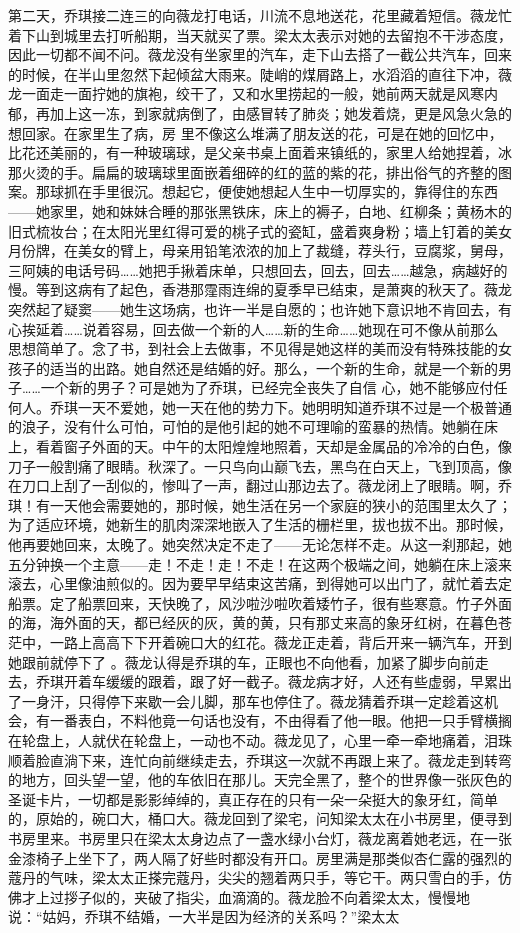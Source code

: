 \documentclass{article}
\begin{document}
第二天，乔琪接二连三的向薇龙打电话，川流不息地送花，花里藏着短信。薇龙忙着下山到城里去打听船期，当天就买了票。梁太太表示对她的去留抱不干涉态度，因此一切都不闻不问。薇龙没有坐家里的汽车，走下山去搭了一截公共汽车，回来的时候，在半山里忽然下起倾盆大雨来。陡峭的煤屑路上，水滔滔的直往下冲，薇龙一面走一面拧她的旗袍，绞干了，又和水里捞起的一般，她前两天就是风寒内郁，再加上这一冻，到家就病倒了，由感冒转了肺炎；她发着烧，更是风急火急的想回家。在家里生了病，房
\newpage
里不像这么堆满了朋友送的花，可是在她的回忆中，比花还美丽的，有一种玻璃球，是父亲书桌上面着来镇纸的，家里人给她捏着，冰那火烫的手。扁扁的玻璃球里面嵌着细碎的红的蓝的紫的花，排出俗气的齐整的图案。那球抓在手里很沉。想起它，便使她想起人生中一切厚实的，靠得住的东西——她家里，她和妹妹合睡的那张黑铁床，床上的褥子，白地、红柳条；黄杨木的旧式梳妆台；在太阳光里红得可爱的桃子式的瓷缸，盛着爽身粉；墙上钉着的美女月份牌，在美女的臂上，母亲用铅笔浓浓的加上了裁缝，荐头行，豆腐浆，舅母，三阿姨的电话号码……她把手揪着床单，只想回去，回去，回去……越急，病越好的慢。等到这病有了起色，香港那霪雨连绵的夏季早已结束，是萧爽的秋天了。薇龙突然起了疑窦——她生这场病，也许一半是自愿的；也许她下意识地不肯回去，有心挨延着……说着容易，回去做一个新的人……新的生命……她现在可不像从前那么思想简单了。念了书，到社会上去做事，不见得是她这样的美而没有特殊技能的女孩子的适当的出路。她自然还是结婚的好。那么，一个新的生命，就是一个新的男子……一个新的男子？可是她为了乔琪，已经完全丧失了自信
\newpage
心，她不能够应付任何人。乔琪一天不爱她，她一天在他的势力下。她明明知道乔琪不过是一个极普通的浪子，没有什么可怕，可怕的是他引起的她不可理喻的蛮暴的热情。她躺在床上，看着窗子外面的天。中午的太阳煌煌地照着，天却是金属品的冷冷的白色，像刀子一般割痛了眼睛。秋深了。一只鸟向山巅飞去，黑鸟在白天上，飞到顶高，像在刀口上刮了一刮似的，惨叫了一声，翻过山那边去了。薇龙闭上了眼睛。啊，乔琪！有一天他会需要她的，那时候，她生活在另一个家庭的狭小的范围里太久了；为了适应环境，她新生的肌肉深深地嵌入了生活的栅栏里，拔也拔不出。那时候，他再要她回来，太晚了。她突然决定不走了——无论怎样不走。从这一刹那起，她五分钟换一个主意——走！不走！走！不走！在这两个极端之间，她躺在床上滚来滚去，心里像油煎似的。因为要早早结束这苦痛，到得她可以出门了，就忙着去定船票。定了船票回来，天快晚了，风沙啦沙啦吹着矮竹子，很有些寒意。竹子外面的海，海外面的天，都已经灰的灰，黄的黄，只有那丈来高的象牙红树，在暮色苍茫中，一路上高高下下开着碗口大的红花。薇龙正走着，背后开来一辆汽车，开到她跟前就停下了
\newpage
。薇龙认得是乔琪的车，正眼也不向他看，加紧了脚步向前走去，乔琪开着车缓缓的跟着，跟了好一截子。薇龙病才好，人还有些虚弱，早累出了一身汗，只得停下来歇一会儿脚，那车也停住了。薇龙猜着乔琪一定趁着这机会，有一番表白，不料他竟一句话也没有，不由得看了他一眼。他把一只手臂横搁在轮盘上，人就伏在轮盘上，一动也不动。薇龙见了，心里一牵一牵地痛着，泪珠顺着脸直淌下来，连忙向前继续走去，乔琪这一次就不再跟上来了。薇龙走到转弯的地方，回头望一望，他的车依旧在那儿。天完全黑了，整个的世界像一张灰色的圣诞卡片，一切都是影影绰绰的，真正存在的只有一朵一朵挺大的象牙红，简单的，原始的，碗口大，桶口大。薇龙回到了梁宅，问知梁太太在小书房里，便寻到书房里来。书房里只在梁太太身边点了一盏水绿小台灯，薇龙离着她老远，在一张金漆椅子上坐下了，两人隔了好些时都没有开口。房里满是那类似杏仁露的强烈的蔻丹的气味，梁太太正搽完蔻丹，尖尖的翘着两只手，等它干。两只雪白的手，仿佛才上过拶子似的，夹破了指尖，血滴滴的。薇龙脸不向着梁太太，慢慢地说：“姑妈，乔琪不结婚，一大半是因为经济的关系吗？”梁太太
\end{document}
